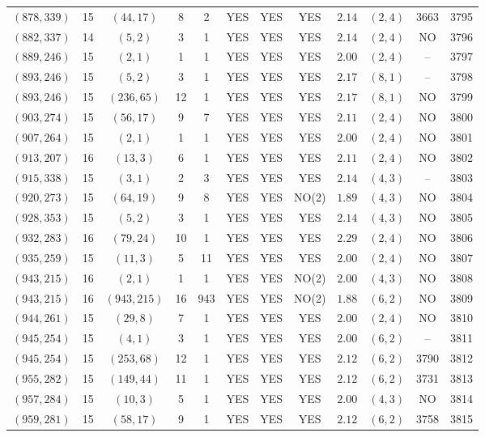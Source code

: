 \begin{longtable}{|c|c|c|c|c|c|c|c|c|c|c|c|}
$(878,339)$ & 15 & $(44,17)$ & 8 & 2 & YES & YES & YES & $2.14$ & $(2,4)$ & 3663 & 3795\\
$(882,337)$ & 14 & $(5,2)$ & 3 & 1 & YES & YES & YES & $2.14$ & $(2,4)$ & NO & 3796\\
$(889,246)$ & 15 & $(2,1)$ & 1 & 1 & YES & YES & YES & $2.00$ & $(2,4)$ & -- & 3797\\
$(893,246)$ & 15 & $(5,2)$ & 3 & 1 & YES & YES & YES & $2.17$ & $(8,1)$ & -- & 3798\\
$(893,246)$ & 15 & $(236,65)$ & 12 & 1 & YES & YES & YES & $2.17$ & $(8,1)$ & NO & 3799\\
$(903,274)$ & 15 & $(56,17)$ & 9 & 7 & YES & YES & YES & $2.11$ & $(2,4)$ & NO & 3800\\
$(907,264)$ & 15 & $(2,1)$ & 1 & 1 & YES & YES & YES & $2.00$ & $(2,4)$ & NO & 3801\\
$(913,207)$ & 16 & $(13,3)$ & 6 & 1 & YES & YES & YES & $2.11$ & $(2,4)$ & NO & 3802\\
$(915,338)$ & 15 & $(3,1)$ & 2 & 3 & YES & YES & YES & $2.14$ & $(4,3)$ & -- & 3803\\
$(920,273)$ & 15 & $(64,19)$ & 9 & 8 & YES & YES & NO(2) & $1.89$ & $(4,3)$ & NO & 3804\\
$(928,353)$ & 15 & $(5,2)$ & 3 & 1 & YES & YES & YES & $2.14$ & $(4,3)$ & NO & 3805\\
$(932,283)$ & 16 & $(79,24)$ & 10 & 1 & YES & YES & YES & $2.29$ & $(2,4)$ & NO & 3806\\
$(935,259)$ & 15 & $(11,3)$ & 5 & 11 & YES & YES & YES & $2.00$ & $(2,4)$ & NO & 3807\\
$(943,215)$ & 16 & $(2,1)$ & 1 & 1 & YES & YES & NO(2) & $2.00$ & $(4,3)$ & NO & 3808\\
$(943,215)$ & 16 & $(943,215)$ & 16 & 943 & YES & YES & NO(2) & $1.88$ & $(6,2)$ & NO & 3809\\
$(944,261)$ & 15 & $(29,8)$ & 7 & 1 & YES & YES & YES & $2.00$ & $(2,4)$ & NO & 3810\\
$(945,254)$ & 15 & $(4,1)$ & 3 & 1 & YES & YES & YES & $2.00$ & $(6,2)$ & -- & 3811\\
$(945,254)$ & 15 & $(253,68)$ & 12 & 1 & YES & YES & YES & $2.12$ & $(6,2)$ & 3790 & 3812\\
$(955,282)$ & 15 & $(149,44)$ & 11 & 1 & YES & YES & YES & $2.12$ & $(6,2)$ & 3731 & 3813\\
$(957,284)$ & 15 & $(10,3)$ & 5 & 1 & YES & YES & YES & $2.00$ & $(4,3)$ & NO & 3814\\
$(959,281)$ & 15 & $(58,17)$ & 9 & 1 & YES & YES & YES & $2.12$ & $(6,2)$ & 3758 & 3815\\

\end{longtable}
